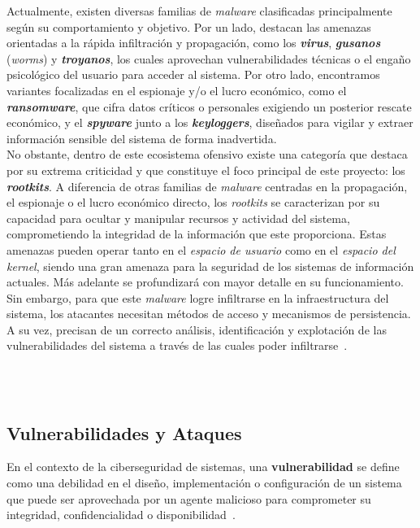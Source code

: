 Actualmente, existen diversas familias de \textit{malware} clasificadas principalmente según su comportamiento y objetivo.
Por un lado, destacan las amenazas orientadas a la rápida infiltración y propagación, como los \textbf{\textit{virus}}, \textbf{\textit{gusanos}} (\textit{worms}) y \textbf{\textit{troyanos}}, los cuales aprovechan vulnerabilidades técnicas o el engaño psicológico del usuario para acceder al sistema.
Por otro lado, encontramos variantes focalizadas en el espionaje y/o el lucro económico, como el \textbf{\textit{ransomware}}, que cifra datos críticos o personales exigiendo un posterior rescate económico, y el \textbf{\textit{spyware}} junto a los \textbf{\textit{keyloggers}}, diseñados para vigilar y extraer información sensible del sistema de forma inadvertida.\\

No obstante, dentro de este ecosistema ofensivo existe una categoría que destaca por su extrema criticidad y que constituye el foco principal de este proyecto: los \textbf{\textit{rootkits}}.
A diferencia de otras familias de \textit{malware} centradas en la propagación, el espionaje o el lucro económico directo, los \textit{rootkits} se caracterizan por su capacidad para ocultar y manipular recursos y actividad del sistema, comprometiendo la integridad de la información que este proporciona.
Estas amenazas pueden operar tanto en el \textit{espacio de usuario} como en el \textit{espacio del kernel}, siendo una gran amenaza para la seguridad de los sistemas de información actuales.
Más adelante se profundizará con mayor detalle en su funcionamiento.\\

Sin embargo, para que este \textit{malware} logre infiltrarse en la infraestructura del sistema, los atacantes necesitan métodos de acceso y mecanismos de persistencia.
A su vez, precisan de un correcto análisis, identificación y explotación de las vulnerabilidades del sistema a través de las cuales poder infiltrarse~\cite{mitre_attack}.\\

\

\

\subsection{Vulnerabilidades y Ataques}
\label{sec:ataques}

En el contexto de la ciberseguridad de sistemas, una \textbf{vulnerabilidad} se define como una debilidad en el diseño, implementación o configuración de un sistema que puede ser aprovechada por un agente malicioso para comprometer su integridad, confidencialidad o disponibilidad~\cite{threat_enisa}.\\

